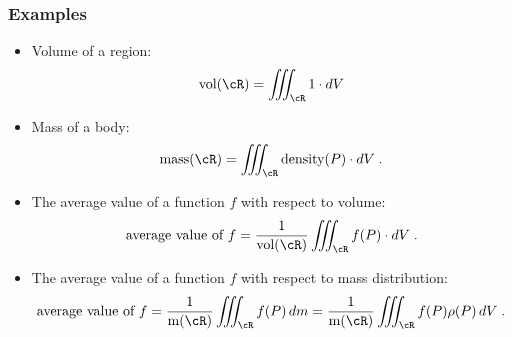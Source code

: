 \begin{frame}
\frametitle{Examples}

\begin{itemize}
  \item Volume of a region:
  $$\text{vol}(\cR) = \int\!\!\!\!\int\!\!\!\!\int_{\cR} 1 \cdot dV$$
  \item Mass of a body:
  $$\text{mass}(\cR) = \int\!\!\!\!\int\!\!\!\!\int_{\cR} \text{density}(P) \cdot dV\; .$$
  \item The average value of a function $f$ with respect to volume:
%
$$\text{average value of }f = \frac{1}{\text{vol}(\cR)} \int\!\!\!\!\int\!\!\!\!\int_{\cR} f(P) \cdot dV\; .$$
  \item The average value of a function $f$ with respect to mass distribution:
%
$$\text{average value of }f = \frac{1}{\text{m}(\cR)} \int\!\!\!\!\int\!\!\!\!\int_{\cR} f(P)\,  dm = \frac{1}{\text{m}(\cR)} \int\!\!\!\!\int\!\!\!\!\int_{\cR} f(P)\rho(P)\, dV\; .$$
\end{itemize}

\end{frame}